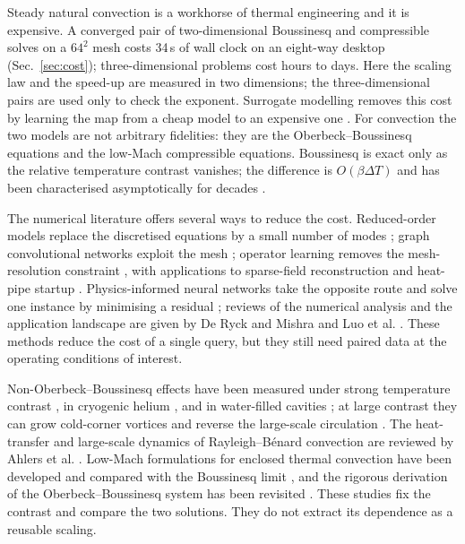 \documentclass[preprint,11pt,a4paper,times,doubleblind]{elsarticle}
\begin{document}
Steady natural convection is a workhorse of thermal engineering and it is expensive. A
converged pair of two-dimensional Boussinesq and compressible solves on a $64^2$ mesh costs
34\,s of wall clock on an eight-way desktop (Sec.~\ref{sec:cost}); three-dimensional problems
cost hours to days. Here the scaling law and the speed-up are measured in two dimensions; the
three-dimensional pairs are used only to check the exponent. Surrogate modelling removes this cost by learning the map from a cheap
model to an expensive one \citep{giacomini2026surrogates,meng2025physics}. For convection the
two models are not arbitrary fidelities: they are the Oberbeck--Boussinesq equations and the
low-Mach compressible equations. Boussinesq is exact only as the relative temperature contrast
vanishes; the difference is $O(\beta\Delta T)$ and has been characterised asymptotically for
decades \citep{spiegel1960boussinesq,gray1976validity}.

The numerical literature offers several ways to reduce the cost. Reduced-order models replace
the discretised equations by a small number of modes \citep{huhn2022parametric}; graph
convolutional networks exploit the mesh \citep{feng2024graph,peng2023physics}; operator
learning removes the mesh-resolution constraint
\citep{lu2021learning,wang2021learning,li2021fourier}, with applications to sparse-field
reconstruction \citep{zhao2023recfno} and heat-pipe startup \citep{yu2026fourier}.
Physics-informed neural networks take the opposite route and solve one instance by minimising a
residual \citep{raissi2019physics,cai2021physics,jalili2023physics,sahin2023deep}; reviews of
the numerical analysis and the application landscape are given by De Ryck and Mishra
\citep{deryck2024numerical} and Luo et al. \citep{luo2025physics}. These methods reduce the cost of a single query, but they still need
paired data at the operating conditions of interest.

Non-Oberbeck--Boussinesq effects have been measured under strong temperature contrast
\citep{yik2020turbulent}, in cryogenic helium \citep{macek2023assessing}, and in water-filled
cavities \citep{pan2023non}; at large contrast they can grow cold-corner vortices and reverse
the large-scale circulation \citep{xia2016flow}. The heat-transfer and large-scale dynamics of
Rayleigh--B\'enard convection are reviewed by Ahlers et al. \citep{ahlers2009heat}. Low-Mach formulations for enclosed thermal
convection have been developed and compared with the Boussinesq limit
\citep{zhang2023investigation,satake2024mathematical}, and the rigorous derivation of the
Oberbeck--Boussinesq system has been revisited \citep{bella2023rigorous}. These studies fix the
contrast and compare the two solutions. They do not extract its dependence as a reusable scaling.
\end{document}
